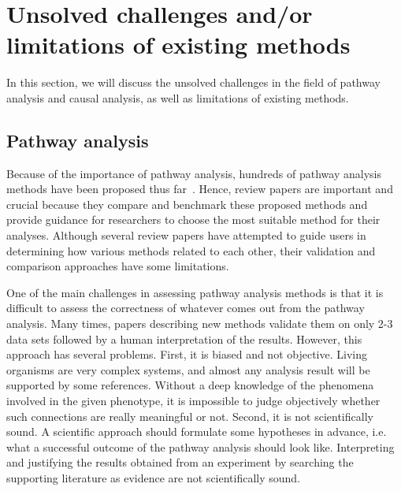 
\section{Unsolved challenges and/or limitations of existing methods}
\label{chap:ExisingMethodsLimitation}

In this section, we will discuss the unsolved challenges in the field of pathway analysis and causal analysis, as well as limitations of existing methods.

\subsection{Pathway analysis}

Because of the importance of pathway analysis, hundreds of pathway analysis methods have been proposed thus far~\cite{DraghiciOntologicalToolsReview:2005,Khatri:2002,mitrea2013methods}.
Hence, review papers are important and crucial because they compare and benchmark these proposed methods and provide guidance for researchers to choose the most suitable method for their analyses.
Although several review papers have attempted to guide users in determining how various methods related to each other, their validation and comparison approaches have some limitations.

One of the main challenges in assessing pathway analysis methods is that it is difficult to assess the correctness of whatever comes out from the pathway analysis. Many times, papers describing new methods validate them on only 2-3 data sets followed by a human interpretation of the results.
However, this approach has several problems. First, it is biased and not objective. Living organisms are very complex systems, and almost any  analysis result will be supported by some references. Without a deep knowledge of the phenomena involved in the given phenotype, it is impossible to judge objectively whether such connections are really meaningful or not. Second, it is not scientifically sound. A scientific approach should formulate some hypotheses in advance, i.e. what a successful outcome of the pathway analysis should look like. Interpreting and justifying the results obtained from an experiment by searching the supporting literature as evidence are not scientifically sound.

